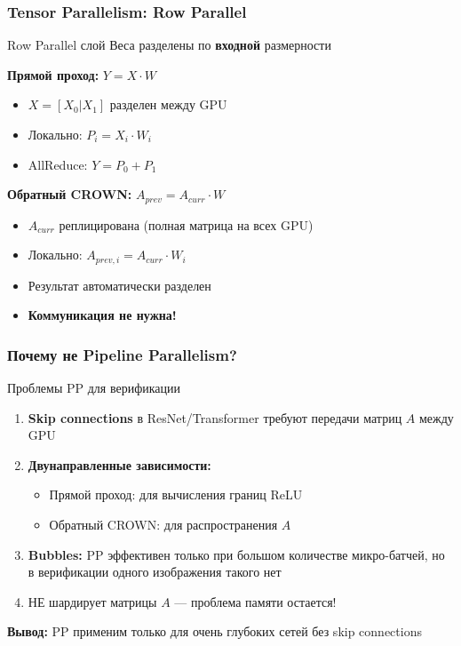 \begin{frame}
\frametitle{Tensor Parallelism: Row Parallel}

\begin{block}{Row Parallel слой}
Веса разделены по \textbf{входной} размерности
\end{block}

\vspace{0.3cm}

\textbf{Прямой проход:} $Y = X \cdot W$
\begin{itemize}
    \item $X = [X_0 | X_1]$ разделен между GPU
    \item Локально: $P_i = X_i \cdot W_i$
    \item AllReduce: $Y = P_0 + P_1$
\end{itemize}

\vspace{0.3cm}

\textbf{Обратный CROWN:} $A_{prev} = A_{curr} \cdot W$
\begin{itemize}
    \item $A_{curr}$ реплицирована (полная матрица на всех GPU)
    \item Локально: $A_{prev,i} = A_{curr} \cdot W_i$
    \item Результат автоматически разделен
    \item \textbf{Коммуникация не нужна!}
\end{itemize}

\end{frame}

\begin{frame}
\frametitle{Почему не Pipeline Parallelism?}

\begin{alertblock}{Проблемы PP для верификации}
\begin{enumerate}
    \item \textbf{Skip connections} в ResNet/Transformer требуют передачи матриц $A$ между GPU
    \item \textbf{Двунаправленные зависимости:}
    \begin{itemize}
        \item Прямой проход: для вычисления границ ReLU
        \item Обратный CROWN: для распространения $A$
    \end{itemize}
    \item \textbf{Bubbles:} PP эффективен только при большом количестве микро-батчей, но в верификации одного изображения такого нет
    \item НЕ шардирует матрицы $A$ --- проблема памяти остается!
\end{enumerate}
\end{alertblock}

\vspace{0.3cm}

\textbf{Вывод:} PP применим только для очень глубоких сетей без skip connections

\end{frame}

